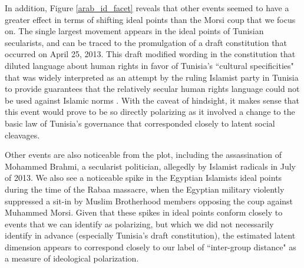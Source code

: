 \documentclass[12pt]{article}
\begin{document}
In addition, Figure \ref{arab_id_facet} reveals that other events seemed to have a greater effect in terms of shifting ideal points than the Morsi coup that we focus on. The single largest movement appears in the ideal points of Tunisian secularists, and can be traced to the promulgation of a draft constitution that occurred on April 25, 2013. This draft modified wording in the constitution that diluted language about human rights in favor of Tunisia's ``cultural specificities" that was widely interpreted as an attempt by the ruling Islamist party in Tunisia to provide guarantees that the relatively secular human rights language could not be used against Islamic norms \parencite{hrw2013}. With the caveat of hindsight, it makes sense that this event would prove to be so directly polarizing as it involved a change to the basic law of Tunisia's governance that corresponded closely to latent social cleavages.

Other events are also noticeable from the plot, including the assassination of Mohammed Brahmi, a secularist politician, allegedly by Islamist radicals in July of 2013. We also see a noticeable spike in the Egyptian Islamists ideal points during the time of the Rabaa massacre, when the Egyptian military violently suppressed a sit-in by Muslim Brotherhood members opposing the coup against Muhammed Morsi. Given that these spikes in ideal points conform closely to events that we can identify as polarizing, but which we did not necessarily  identify in advance (especially Tunisia's draft constitution), the estimated latent dimension appears to correspond closely to our label of ``inter-group distance" as a measure of ideological polarization.
\end{document}
